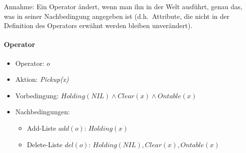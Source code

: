 Annahme: Ein Operator ändert, wenn man ihn in der Welt ausführt, genau das, was in seiner Nachbedingung angegeben ist (d.h.\ Attribute, die nicht in der Definition des Operators erwähnt werden bleiben unverändert).

\paragraph{Operator}
\begin{itemize}
	\item Operator: $o$
	\item Aktion: \emph{Pickup(x)}
	\item Vorbedingung: $Holding(NIL) \wedge Clear(x) \wedge Ontable(x)$
	\item Nachbedingungen:
	\begin{itemize}
		\item Add-Liste $add(o)$: $Holding(x)$
		\item Delete-Liste $del(o)$: $Holding(NIL), Clear(x), Ontable(x)$
	\end{itemize}
\end{itemize}

